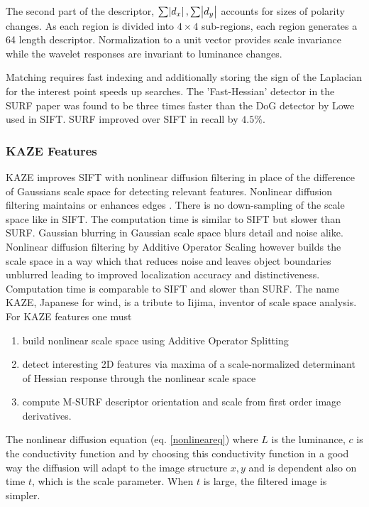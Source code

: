\documentclass[english,12pt,a4paper,pdftex,elec,utf8, table]{aaltothesis}
\begin{document}
The second part of the descriptor, $\sum \abs{d_x}, \sum \abs{d_y}$ accounts for sizes of polarity changes. As each region is divided into $4 \times 4$ sub-regions, each region generates a 64 length descriptor. Normalization to a unit vector provides scale invariance while the wavelet responses are invariant to luminance changes. \cite{Bay2006}

Matching requires fast indexing and additionally storing the sign of the Laplacian for the interest point speeds up searches. The 'Fast-Hessian' detector in the SURF paper was found to be three times faster than the DoG detector by Lowe used in SIFT. SURF improved over SIFT in recall by $4.5\%$. \cite{Bay2006}

\subsubsection{KAZE Features}
KAZE improves SIFT with nonlinear diffusion filtering in place of the difference of Gaussians scale space for detecting relevant features. Nonlinear diffusion filtering maintains or enhances edges \cite{Weickert1998}. There is no down-sampling of the scale space like in SIFT. The computation time is similar to SIFT but slower than SURF. Gaussian blurring in Gaussian scale space blurs detail and noise alike. Nonlinear diffusion filtering by Additive Operator Scaling however builds the scale space in a way which that reduces noise and leaves object boundaries unblurred leading to improved localization accuracy and distinctiveness. Computation time is comparable to SIFT and slower than SURF. The name KAZE, Japanese for wind, is a tribute to Iijima, inventor of scale space analysis. For KAZE features one must

\begin{enumerate}
\item build nonlinear scale space using Additive Operator Splitting
\item detect interesting 2D features via maxima of a scale-normalized determinant of Hessian response through the nonlinear scale space
\item compute M-SURF descriptor orientation and scale from first order image derivatives.
\end{enumerate}

The nonlinear diffusion equation (eq. \ref{nonlineareq}) where $L$ is the luminance, $c$ is the conductivity function and by choosing this conductivity function in a good way the diffusion will adapt to the image structure $x, y$ and is dependent also on time $t$, which is the scale parameter. When $t$ is large, the filtered image is simpler. \cite{Alcantarilla2013}
\end{document}
